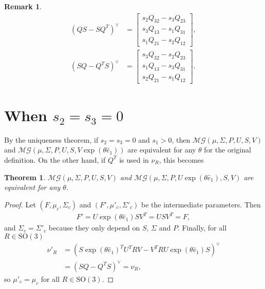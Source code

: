 \documentclass[10pt,twocolumn]{article}
\newtheorem{theorem}{Theorem}
\newtheorem{remark}{Remark}
\newcommand{\SO}{\ensuremath{\mathrm{SO(3)}}}
\begin{document}
\begin{remark}
	\begin{align}
		(QS-SQ^T)^\vee &= \begin{bmatrix} s_2Q_{32}-s_3Q_{23} \\ s_3Q_{13}-s_1Q_{31} \\ s_1Q_{21}-s_2Q_{12} \end{bmatrix}, \\
		(SQ-Q^TS)^\vee &= \begin{bmatrix} s_3Q_{32}-s_2Q_{23} \\ s_1Q_{13}-s_3Q_{31} \\ s_2Q_{21}-s_1Q_{12} \end{bmatrix}.
	\end{align}
\end{remark}

\section{When $s_2=s_3=0$}

By the uniqueness theorem, if $s_2=s_3=0$ and $s_1>0$, then $\mathcal{MG}(\mu,\Sigma,P,U,S,V)$ and $\mathcal{MG}(\mu,\Sigma,P,U,S,V\exp(\theta\hat{e}_1))$ are equivalent for any $\theta$ for the original definition.
On the other hand, if $Q^T$ is used in $\nu_R$, this becomes
\begin{theorem}
	$\mathcal{MG}(\mu,\Sigma,P,U,S,V)$ and $\mathcal{MG}(\mu,\Sigma,P,U\exp(\theta\hat{e}_1),S,V)$ are equivalent for any $\theta$.
\end{theorem}
\begin{proof}
	Let $(F,\mu_c,\Sigma_c)$ and $(F',\mu'_c,\Sigma'_c)$ be the intermediate parameters.
	Then
	\begin{gather*}
		F' = U\exp(\theta\hat{e}_1)SV^T = USV^T = F,
	\end{gather*}
	and $\Sigma_c = \Sigma'_c$ because they only depend on $S$, $\Sigma$ and $P$.
	Finally, for all $R\in\SO$
	\begin{align*}
		\nu'_R &= (S\exp(\theta\hat{e}_1)^TU^TRV - V^TRU\exp(\theta\hat{e}_1)S)^\vee \\
		&= (SQ-Q^TS)^\vee = \nu_R,
	\end{align*}
	so $\mu'_c = \mu_c$ for all $R\in\SO$.
\end{proof}
\end{document}

